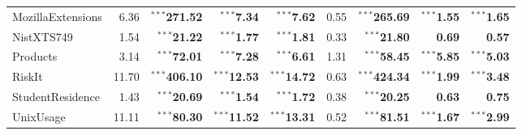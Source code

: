 \documentclass{article}
\newcommand{\schemaForTable}[1]{#1\xspace}
\newcommand{\MozillaExtensionsForTable}{\schemaForTable{MozillaExtensions}}
\newcommand{\NistXTSNineForTable}{\schemaForTable{NistXTS749}}
\newcommand{\ProductsForTable}{\schemaForTable{Products}}
\newcommand{\RiskItForTable}{\schemaForTable{RiskIt}}
\newcommand{\StudentResidenceForTable}{\schemaForTable{StudentResidence}}
\newcommand{\UnixUsageForTable}{\schemaForTable{UnixUsage}}
\begin{document}
\begin{table}[!ht]
\begin{center}
{\begin{tabular}{lrrrr|rrrr}
\MozillaExtensionsForTable&6.36&$^{\ast\ast\ast}$\textbf{271.52}&$^{\ast\ast\ast}$\textbf{7.34}&$^{\ast\ast\ast}$\textbf{7.62}&0.55&$^{\ast\ast\ast}$\textbf{265.69}&$^{\ast\ast\ast}$\textbf{1.55}&$^{\ast\ast\ast}$\textbf{1.65}\\
\NistXTSNineForTable&1.54&$^{\ast\ast\ast}$\textbf{21.22}&$^{\ast\ast\ast}$\textbf{1.77}&$^{\ast\ast\ast}$\textbf{1.81}&0.33&$^{\ast\ast\ast}$\textbf{21.80}&\textbf{0.69}&\textbf{0.57}\\
\ProductsForTable&3.14&$^{\ast\ast\ast}$\textbf{72.01}&$^{\ast\ast\ast}$\textbf{7.28}&$^{\ast\ast\ast}$\textbf{6.61}&1.31&$^{\ast\ast\ast}$\textbf{58.45}&$^{\ast\ast\ast}$\textbf{5.85}&$^{\ast\ast\ast}$\textbf{5.03}\\
\RiskItForTable&11.70&$^{\ast\ast\ast}$\textbf{406.10}&$^{\ast\ast\ast}$\textbf{12.53}&$^{\ast\ast\ast}$\textbf{14.72}&0.63&$^{\ast\ast\ast}$\textbf{424.34}&$^{\ast\ast\ast}$\textbf{1.99}&$^{\ast\ast\ast}$\textbf{3.48}\\
\StudentResidenceForTable&1.43&$^{\ast\ast\ast}$\textbf{20.69}&$^{\ast\ast\ast}$\textbf{1.54}&$^{\ast\ast\ast}$\textbf{1.72}&0.38&$^{\ast\ast\ast}$\textbf{20.25}&\textbf{0.63}&\textbf{0.75}\\
\UnixUsageForTable&11.11&$^{\ast\ast\ast}$\textbf{80.30}&$^{\ast\ast\ast}$\textbf{11.52}&$^{\ast\ast\ast}$\textbf{13.31}&0.52&$^{\ast\ast\ast}$\textbf{81.51}&$^{\ast\ast\ast}$\textbf{1.67}&$^{\ast\ast\ast}$\textbf{2.99}\\      \hline
      \end{tabular}
    }
  \end{center}
\end{table}
\end{document}
